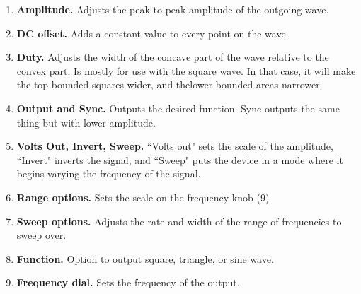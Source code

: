 \begin{enumerate}
\item \textbf{Amplitude.} Adjusts the peak to peak amplitude of the outgoing wave.
\item \textbf{DC offset.} Adds a constant value to every point on the wave.
\item \textbf{Duty.} Adjusts the width of the concave part of the wave relative to the convex part. Is mostly for use with the square wave. In that case, it will make the top-bounded squares wider, and thelower bounded areas narrower.  
\item \textbf{Output and Sync.} Outputs the desired function. Sync outputs the same thing but with lower amplitude.
\item \textbf{Volts Out, Invert, Sweep.} ``Volts out" sets the scale of the amplitude, ``Invert" inverts the signal, and ``Sweep" puts the device in a mode where it begins varying the frequency of the signal.
\item \textbf{Range options.} Sets the scale on the frequency knob (9)
\item \textbf{Sweep options.} Adjusts the rate and width of the range of frequencies to sweep over.
\item \textbf{Function.} Option to output square, triangle, or sine wave.
\item \textbf{Frequency dial.} Sets the frequency of the output.
\end{enumerate}


